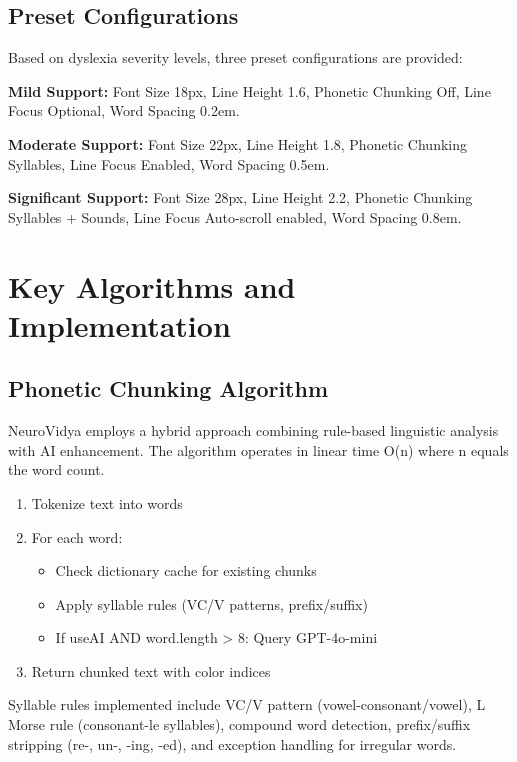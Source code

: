 \documentclass[journal]{IEEEtran}
\begin{document}
\subsection{Preset Configurations}

Based on dyslexia severity levels, three preset configurations are provided:

\textbf{Mild Support:} Font Size 18px, Line Height 1.6, Phonetic Chunking Off, Line Focus Optional, Word Spacing 0.2em.

\textbf{Moderate Support:} Font Size 22px, Line Height 1.8, Phonetic Chunking Syllables, Line Focus Enabled, Word Spacing 0.5em.

\textbf{Significant Support:} Font Size 28px, Line Height 2.2, Phonetic Chunking Syllables + Sounds, Line Focus Auto-scroll enabled, Word Spacing 0.8em.

\section{Key Algorithms and Implementation}

\subsection{Phonetic Chunking Algorithm}

NeuroVidya employs a hybrid approach combining rule-based linguistic analysis with AI enhancement. The algorithm operates in linear time O(n) where n equals the word count.

\begin{enumerate}
    \item Tokenize text into words
    \item For each word:
    \begin{itemize}
        \item Check dictionary cache for existing chunks
        \item Apply syllable rules (VC/V patterns, prefix/suffix)
        \item If useAI AND word.length > 8: Query GPT-4o-mini
    \end{itemize}
    \item Return chunked text with color indices
\end{enumerate}

Syllable rules implemented include VC/V pattern (vowel-consonant/vowel), L Morse rule (consonant-le syllables), compound word detection, prefix/suffix stripping (re-, un-, -ing, -ed), and exception handling for irregular words.
\end{document}
